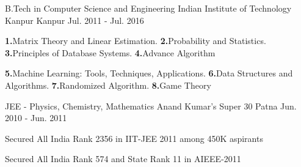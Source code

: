 


\begin{cventries}

  \cventry
    {B.Tech in Computer Science and Engineering} %
    {Indian Institute of Technology Kanpur} %
    {Kanpur} %
    {Jul. 2011 - Jul. 2016} %
    {
      \begin{cvitems} %
      \item {\textbf{1.}Matrix Theory and Linear Estimation.  \hspace{0.1cm}\textbf{2.}Probability and Statistics. \hspace{0.1cm}\textbf{3.}Principles of Database Systems. \hspace{0.1cm}\textbf{4.}Advance Algorithm }
      \item {\textbf{5.}Machine Learning: Tools, Techniques, Applications. \hspace{0.1cm}\textbf{6.}Data Structures and Algorithms. \hspace{0.1cm}\textbf{7.}Randomized Algorithm.  \hspace{0.1cm}\textbf{8.}Game Theory}
      \end{cvitems}
    }

 \cventry
    {JEE - Physics, Chemistry, Mathematics} %
    {Anand Kumar's Super 30} %
    {Patna} %
    {Jun. 2010 - Jun. 2011} %
    {
      \begin{cvitems} %
        \item {Secured All India Rank 2356 in IIT-JEE 2011 among 450K aspirants }
        \item {Secured All India Rank 574 and State Rank 11 in AIEEE-2011}
      \end{cvitems}
    }

\end{cventries}

